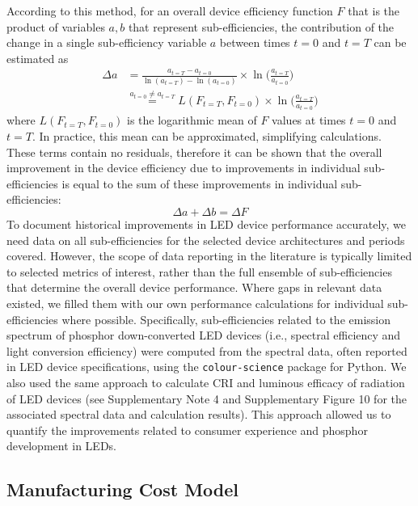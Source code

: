 \documentclass[parskip=full]{article}
\begin{document}
According to this method, for an overall device efficiency function $F$ that is the product of variables $a, b$ that represent sub-efficiencies, the contribution of the change in a single sub-efficiency variable $a$ between times $t=0$ and $t=T$ can be estimated as \cite{Ang2019}
%
\begin{align}
    \Delta a &= \frac{a_{t=T} - a_{t=0}}{\ln(a_{t=T}) - \ln(a_{t=0})} \times \ln \big ( \frac{a_{t=T}}{a_{t=0}} \big ) \\
    & \stackrel{a_{t=0} \neq a_{t=T}}{=} L(F_{t=T}, F_{t=0}) \times \ln \big ( \frac{a_{t=T}}{a_{t=0}} \big )
\end{align}
%
where $L(F_{t=T}, F_{t=0})$ is the logarithmic mean of $F$ values at times $t=0$ and $t=T$. In practice, this mean can be approximated, simplifying calculations. These terms contain no residuals, therefore it can be shown that the overall improvement in the device efficiency due to improvements in individual sub-efficiencies is equal to the sum of these improvements in individual sub-efficiencies: 
%
\begin{equation}
    \Delta a + \Delta b  = \Delta F
\end{equation}
%
To document historical improvements in LED device performance accurately, we need data on all sub-efficiencies for the selected device architectures and periods covered. However, the scope of data reporting in the literature is typically limited to selected metrics of interest, rather than the full ensemble of sub-efficiencies that determine the overall device performance. Where gaps in relevant data existed, we filled them with our own performance calculations for individual sub-efficiencies where possible. Specifically, sub-efficiencies related to the emission spectrum of phosphor down-converted LED devices (i.e., spectral efficiency and light conversion efficiency)  were computed from the spectral data, often reported in LED device specifications, using the \texttt{colour-science} package for Python. We also used the same approach to calculate CRI and luminous efficacy of radiation of LED devices (see Supplementary Note 4 and Supplementary Figure 10 for the associated spectral data and calculation results). This approach allowed us to quantify the improvements related to consumer experience and phosphor development in LEDs.

\subsection{Manufacturing Cost Model}
\end{document}
